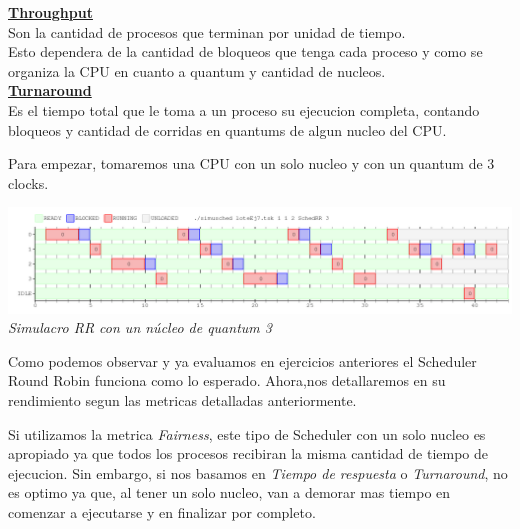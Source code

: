 \textbf{\underline{Throughput}}\\
Son la cantidad de procesos que terminan por unidad de tiempo.\\
Esto dependera de la cantidad de bloqueos que tenga cada proceso y como se organiza la CPU en cuanto a quantum y cantidad de nucleos.\\

\textbf{\underline{Turnaround}}\\
Es el tiempo total que le toma a un proceso su ejecucion completa, contando bloqueos y cantidad de corridas en quantums de algun nucleo del CPU.

\vspace{1 cm}
Para empezar, tomaremos una CPU con un solo nucleo y con un quantum de 3 clocks.\\

\vspace{\baselineskip}
\begin{center}
\includegraphics[scale=0.45]{../tp1/Test/resEj7Co1.png}
\\
\vspace{1pt}
\footnotesize\textit{Simulacro RR con un n\'ucleo de quantum 3}
\end{center}
\vspace{\baselineskip}

Como podemos observar y ya evaluamos en ejercicios anteriores el Scheduler Round Robin funciona como lo esperado.
Ahora,nos detallaremos en su rendimiento segun las metricas detalladas anteriormente.

Si utilizamos la metrica \textit{Fairness}, este tipo de Scheduler con un solo nucleo es apropiado ya que todos los procesos recibiran la misma cantidad de tiempo de ejecucion.
Sin embargo, si nos basamos en \textit{Tiempo de respuesta} o \textit{Turnaround}, no es optimo ya que, al tener un solo nucleo, van a demorar mas tiempo en comenzar a ejecutarse y en finalizar por completo.

